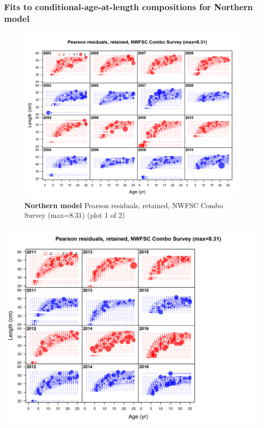 \documentclass[12pt,]{article}
\begin{document}
\FloatBarrier

\newpage

\subsubsection{Fits to conditional-age-at-length compositions for
Northern
model}\label{fits-to-conditional-age-at-length-compositions-for-northern-model}

\begin{figure}[htbp]
\centering
\includegraphics{./r4ss/plots_mod1/comp_condAALfit_residsflt6mkt2_page1.png}
\caption{\textbf{Northern model} Pearson residuals, retained, NWFSC
Combo Survey (max=8.31) (plot 1 of 2)
\label{fig:mod1_1_comp_condAALfit_residsflt6mkt2_page1}}
\end{figure}

\includegraphics{./r4ss/plots_mod1/comp_condAALfit_residsflt6mkt2_page2.png}
\end{document}
